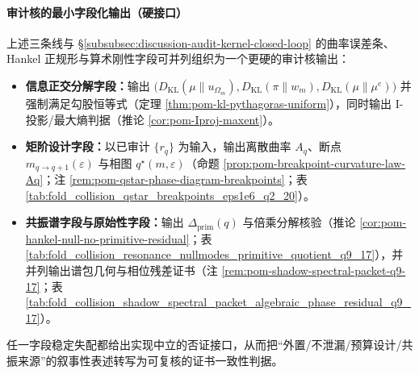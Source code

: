 \paragraph{审计核的最小字段化输出（硬接口）}
上述三条线与 \S\ref{subsubsec:discussion-audit-kernel-closed-loop} 的曲率误差条、Hankel 正规形与算术刚性字段可并列组织为一个更硬的审计核输出：
\begin{itemize}
  \item \textbf{信息正交分解字段：}输出 \(\bigl(D_{\mathrm{KL}}(\mu\|u_{\Omega_m}),D_{\mathrm{KL}}(\pi\|w_m),D_{\mathrm{KL}}(\mu\|\mu^e)\bigr)\) 并强制满足勾股恒等式（定理 \ref{thm:pom-kl-pythagoras-uniform}），同时输出 I-投影/最大熵判据（推论 \ref{cor:pom-Iproj-maxent}）。
  \item \textbf{矩阶设计字段：}以已审计 \(\{r_q\}\) 为输入，输出离散曲率 \(A_q\)、断点 \(m_{q\to q+1}(\varepsilon)\) 与相图 \(q^\star(m,\varepsilon)\)（命题 \ref{prop:pom-breakpoint-curvature-law-Aq}；注 \ref{rem:pom-qstar-phase-diagram-breakpoints}；表 \ref{tab:fold_collision_qstar_breakpoints_eps1e6_q2_20}）。
  \item \textbf{共振谱字段与原始性字段：}输出 \(\Delta_{\mathrm{prim}}(q)\) 与倍乘分解核验（推论 \ref{cor:pom-hankel-null-no-primitive-residual}；表 \ref{tab:fold_collision_resonance_nullmodes_primitive_quotient_q9_17}），并并列输出谱包几何与相位残差证书（注 \ref{rem:pom-shadow-spectral-packet-q9-17}；表 \ref{tab:fold_collision_shadow_spectral_packet_algebraic_phase_residual_q9_17}）。
\end{itemize}
任一字段稳定失配都给出实现中立的否证接口，从而把“外置/不泄漏/预算设计/共振来源”的叙事性表述转写为可复核的证书一致性判据。

